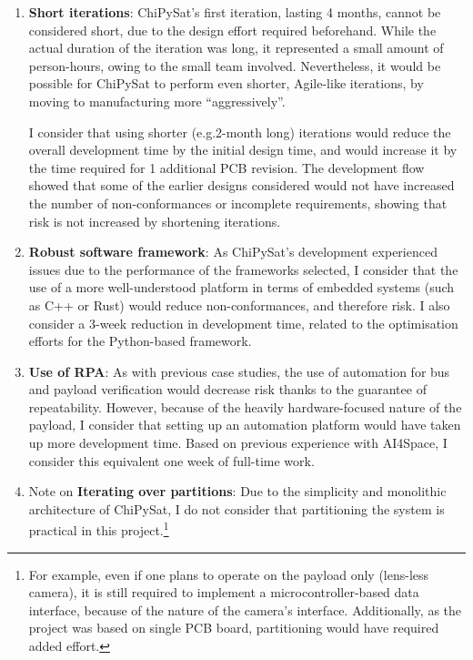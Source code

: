 \documentclass[a4paper,nobib,justified,final]{tufte-book}
\begin{document}
\begin{enumerate}
	\item \textbf{Short iterations}:
	ChiPySat's first iteration, lasting 4 months, cannot be considered short, due to the design effort required beforehand. While the actual duration of the iteration was long, it represented a small amount of person-hours, owing to the small team involved. Nevertheless, it would be possible for ChiPySat to perform even shorter, Agile-like iterations, by moving to manufacturing more ``aggressively''.

	I consider that using shorter (e.g.\@2-month long) iterations would reduce the overall development time by the initial design time, and would increase it by the time required for 1 additional \acs{PCB} revision. The development flow showed that some of the earlier designs considered would not have increased the number of non-conformances or incomplete requirements, showing that risk is not increased by shortening iterations.

	\item \textbf{Robust software framework}:
	As ChiPySat's development experienced issues due to the performance of the frameworks selected, I consider that the use of a more well-understood platform in terms of embedded systems (such as C++ or Rust) would reduce non-conformances, and therefore risk. I also consider a 3-week reduction in development time, related to the optimisation efforts for the Python-based framework.

	\item \textbf{Use of \acl{RPA}}:
	As with previous case studies, the use of automation for bus and payload verification would decrease risk thanks to the guarantee of repeatability. However, because of the heavily hardware-focused nature of the payload, I consider that setting up an automation platform would have taken up more development time. Based on previous experience with AI4Space, I consider this equivalent one week of full-time work.


	\item Note on \textbf{Iterating over partitions}:
	Due to the simplicity and monolithic architecture of ChiPySat, I do not consider that partitioning the system is practical in this project.\footnote{For example, even if one plans to operate on the payload only (lens-less camera), it is still required to implement a microcontroller-based data interface, because of the nature of the camera's interface. Additionally, as the project was based on single \acs{PCB} board, partitioning would have required added effort.}
\end{enumerate}
\end{document}
